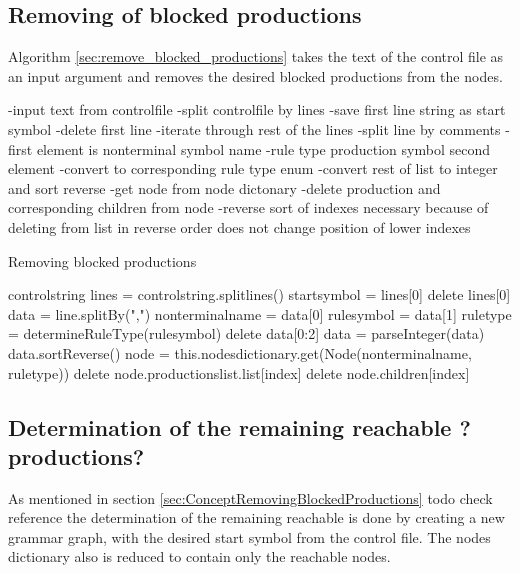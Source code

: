 \subsection{Removing of blocked productions}
Algorithm \ref{sec:remove_blocked_productions} takes the text of the control file as an input argument and removes the desired blocked productions from the nodes.

-input text from controlfile
-split controlfile by lines
-save first line string as start symbol
-delete first line
-iterate through rest of the lines
-split line by comments
-first element is nonterminal symbol name
-rule type production symbol second element
-convert to corresponding rule type enum 
-convert rest of list to integer and sort reverse
-get node from node dictonary
-delete production and corresponding children from node
-reverse sort of indexes necessary because of deleting from list in reverse order does not change position of lower indexes
\begin{algorithm}[H]
\caption{Removing blocked productions}
\begin{algorithmic}[1] 
\Require control\textunderscore string
\State lines = control\textunderscore string.splitlines()
\State start\textunderscore symbol = lines[0]
\State delete lines[0]
	\State data = line.splitBy(",")
	\State nonterminal\textunderscore name = data[0]
	\State rule\textunderscore symbol = data[1]
	\State rule\textunderscore type = determineRuleType(rule\textunderscore symbol)
	\State delete data[0:2]
	\State data = parseInteger(data)
	\State data.sortReverse()
	\State node = this.nodes\textunderscore dictionary.get(Node(nonterminal\textunderscore name, rule\textunderscore type))
		\State delete node.productions\textunderscore list.list[index]
		\State delete node.children[index]
	\EndFor
\EndFor
\end{algorithmic}
\label{alg:remove_blocked_productions}
\end{algorithm}

\subsection{Determination of the remaining reachable ?productions?}
As mentioned in section \ref{sec:ConceptRemovingBlockedProductions} todo check reference the determination of the remaining reachable is done by creating a new grammar graph, with the desired start symbol from the control file. The nodes dictionary also is reduced to contain only the reachable nodes. 

